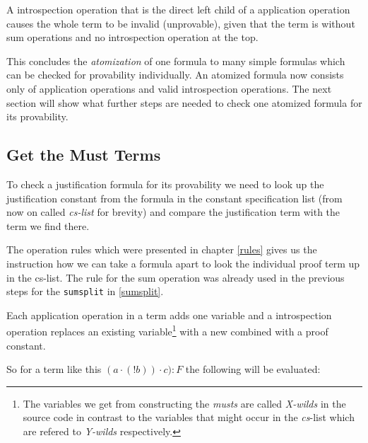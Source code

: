 \begin{assertion}
A introspection operation that is the direct left child of a application operation causes the whole term to be invalid (unprovable), given that the term is without sum operations and no introspection operation at the top.
\end{assertion}



\par
This concludes the \emph{atomization} of one formula to many simple formulas which can be checked for provability individually. An atomized formula now consists only of application operations and valid introspection operations. The next section will show what further steps are needed to check one atomized formula for its provability.

\subsection{Get the Must Terms}\label{chap:Algorithm.musts}
To check a justification formula for its provability we need to look up the justification constant from the formula in the constant specification list (from now on called \emph{cs-list} for brevity) and compare the justification term with the term we find there.

The operation rules which were presented in chapter \ref{rules} gives us the instruction how we can take a formula apart to look the individual proof term up in the cs-list. The rule for the sum operation was already used in the previous steps for the \texttt{sumsplit} in \ref{sumsplit}.

Each application operation in a term adds one variable and a introspection operation replaces an existing variable\footnote{The variables we get from constructing the \emph{musts} are called \emph{X-wilds} in the source code in contrast to the variables that might occur in the \emph{cs}-list which are refered to \emph{Y-wilds} respectively.} with a new combined with a proof constant. 

So for a term like this $(a \cdot (!b)) \cdot c):F$ the following will be evaluated:

